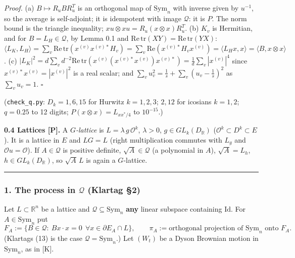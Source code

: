\emph{Proof.} (a) \(B\mapsto R_uBR_u^T\) is an orthogonal map of \(\mathrm{Sym}_n\) with inverse given by \(u^{-1}\), so the average is self-adjoint; it is idempotent with
image \(\mathcal Q\): it is \(P\). The norm bound is the triangle inequality; \(xu\otimes xu=R_u(x\otimes x)R_u^T\). (b) \(K_v\) is Hermitian, and for \(B=L_H\in\mathcal Q\),
by Lemma 0.1 and \(\mathrm{Re\,tr}(XY)=\mathrm{Re\,tr}(YX)\): \(\langle L_K,L_H\rangle=\sum_v\mathrm{Re\,tr}(x^{(v)}x^{(v)*}H_v)=\sum_v\mathrm{Re}(x^{(v)*}H_vx^{(v)}) =\langle L_Hx,x\rangle=\langle B,x\otimes x\rangle\). (c) \(|L_K|^2=d\sum_v d^{-2}\mathrm{Re\,tr}(x^{(v)}(x^{(v)*}x^{(v)})x^{(v)*})=\frac1d\sum_v|x^{(v)}|^4\) since
\(x^{(v)*}x^{(v)}=|x^{(v)}|^2\) is a real scalar; and \(\sum_vu_v^2=\frac1s+\sum_v(u_v-\frac1s)^2\) as \(\sum_v u_v=1\). \(\square\)

(\texttt{check\_q.py}: \(D_k=1,6,15\) for Hurwitz \(k=1,2,3\); \(2,12\) for icosians \(k=1,2\); \(q=0.25\) to 12 digits; \(P(x\otimes x)=L_{xx^*/4}\) to \(10^{-15}\).)

\textbf{0.4 Lattices {[}P{]}.} A \emph{\(G\)-lattice} is \(L=\lambda\,g\,\mathcal O^k\), \(\lambda>0\), \(g\in GL_k(D_{\mathbb R})\) (\(\mathcal O^k\subset D^k\subset E\)). It is a lattice in \(E\)
and \(LG=L\) (right multiplication commutes with \(L_g\) and \(\mathcal O u=\mathcal O\)). If \(A\in\mathcal Q\) is positive definite, \(\sqrt A\in\mathcal Q\)
(a polynomial in \(A\)), \(\sqrt A=L_h\), \(h\in GL_k(D_\mathbb R)\), so \(\sqrt A\,L\) is again a \(G\)-lattice.

\begin{center}\rule{0.5\linewidth}{0.5pt}\end{center}

\hypertarget{the-process-in-mathcal-q-klartag-2}{%
\subsubsection*{\texorpdfstring{1. The process in \(\mathcal Q\) (Klartag §2)}{1. The process in \textbackslash mathcal Q (Klartag §2)}}\label{the-process-in-mathcal-q-klartag-2}}

Let \(L\subset\mathbb R^n\) be a lattice and \(\mathcal Q\subseteq\mathrm{Sym}_n\) \textbf{any} linear subspace containing \(\mathrm{Id}\). For \(A\in\mathrm{Sym}_n\) put
\[F_A:=\{B\in\mathcal Q:\ Bx\cdot x=0\ \ \forall x\in\partial E_A\cap L\},\qquad \pi_A:=\text{orthogonal projection of }\mathrm{Sym}_n\text{ onto }F_A .\tag{13$_\mathcal Q$}\]
(Klartag\textquotesingle s (13) is the case \(\mathcal Q=\mathrm{Sym}_n\).) Let \((W_t)\) be a Dyson Brownian motion in \(\mathrm{Sym}_n\), as in {[}K{]}.

